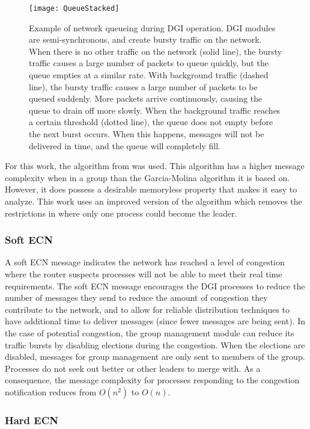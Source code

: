 \begin{figure}
\texttt{[image: QueueStacked]}
\caption{
Example of network queueing during \ac{DGI} operation. \ac{DGI} modules are semi-synchronous, and create bursty traffic on the network.
When there is no other traffic on the network (solid line), the bursty traffic causes a large number of packets to queue quickly, but the queue empties at a similar rate.
With background traffic (dashed line), the bursty traffic causes a large number of packets to be queued suddenly. More packets arrive continuously, causing the queue to drain off more slowly.
When the background traffic reaches a certain threshold (dotted line), the queue does not empty before the next burst occurs. When this happens, messages will not be delivered in time, and the queue will completely fill.
}
\label{fig:queue-types}
\end{figure}

For this work, the algorithm from \cite{JOURNALANON} was used.
This algorithm has a higher message complexity when in a group than the Garcia-Molina algorithm it is based on.
However, it does possess a desirable memoryless property that makes it easy to analyze.
This work uses an improved version of the algorithm which removes the restrictions in \cite{JOURNALANON} where only one process could become the leader.

\subsubsection{Soft \ac{ECN}}

A soft \ac{ECN} message indicates the network has reached a level of congestion where the router suspects processes will not be able to meet their real time requirements.
The soft \ac{ECN} message encourages the \ac{DGI} processes to reduce the number of messages they send to reduce the amount of congestion they contribute to the network, and to allow for reliable distribution techniques to have additional time to deliver messages (since fewer messages are being sent).
In the case of potential congestion, the group management module can reduce its traffic bursts by disabling elections during the congestion.
When the elections are disabled, messages for group management are only sent to members of the group.
Processes do not seek out better or other leaders to merge with.
As a consequence, the message complexity for processes responding to the congestion notification reduces from $O(n^2)$ to $O(n)$.

\subsubsection{Hard \ac{ECN}}


